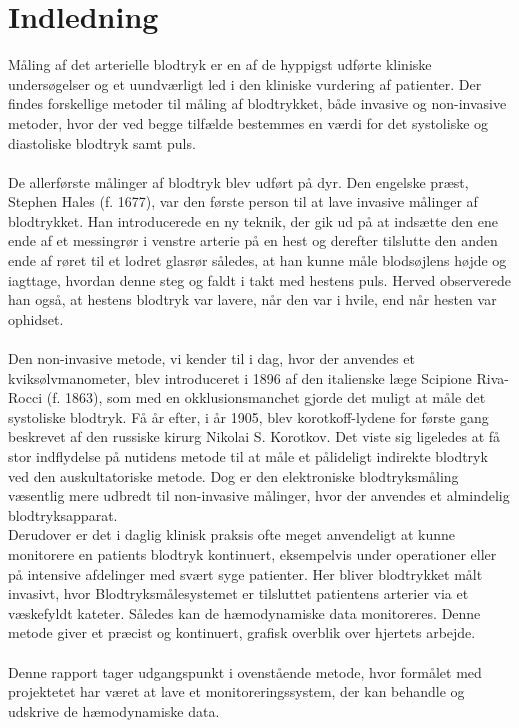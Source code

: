 \chapter{Indledning}
Måling af det arterielle blodtryk er en af de hyppigst udførte kliniske undersøgelser og et uundværligt led i den kliniske vurdering af patienter. Der findes forskellige metoder til måling af blodtrykket, både invasive og non-invasive metoder, hvor der ved begge tilfælde bestemmes en værdi for det systoliske og diastoliske blodtryk samt puls. \\\\
De allerførste målinger af blodtryk blev udført på dyr. Den engelske præst, Stephen Hales (f. 1677), var den første person til at lave invasive målinger af blodtrykket. Han introducerede en ny teknik, der gik ud på at indsætte den ene ende af et messingrør i venstre arterie på en hest og derefter tilslutte den anden ende af røret til et lodret glasrør således, at han kunne måle blodsøjlens højde og iagttage, hvordan denne steg og faldt i takt med hestens puls. Herved observerede han også, at hestens blodtryk var lavere, når den var i hvile, end når hesten var ophidset. \\\\
Den non-invasive metode, vi kender til i dag, hvor der anvendes et kviksølvmanometer, blev introduceret i 1896 af den italienske læge Scipione Riva-Rocci (f. 1863), som med en okklusionsmanchet gjorde det muligt at måle det systoliske blodtryk. Få år efter, i år 1905, blev korotkoff-lydene for første gang beskrevet af den russiske kirurg Nikolai S. Korotkov. Det viste sig ligeledes at få stor indflydelse på nutidens metode til at måle et pålideligt indirekte blodtryk ved den auskultatoriske metode. Dog er den elektroniske blodtryksmåling væsentlig mere udbredt til non-invasive målinger, hvor der anvendes et almindelig blodtryksapparat. \\
Derudover er det i daglig klinisk praksis ofte meget anvendeligt at kunne monitorere en patients blodtryk kontinuert, eksempelvis under operationer eller på intensive afdelinger med svært syge patienter. Her bliver blodtrykket målt invasivt, hvor Blodtryksmålesystemet er tilsluttet patientens arterier via et væskefyldt kateter. Således kan de hæmodynamiske data monitoreres. Denne metode giver et præcist og kontinuert, grafisk overblik over hjertets arbejde. \\\\
Denne rapport tager udgangspunkt i ovenstående metode, hvor formålet med projektetet har været at lave et monitoreringssystem, der kan behandle og udskrive de hæmodynamiske data.






